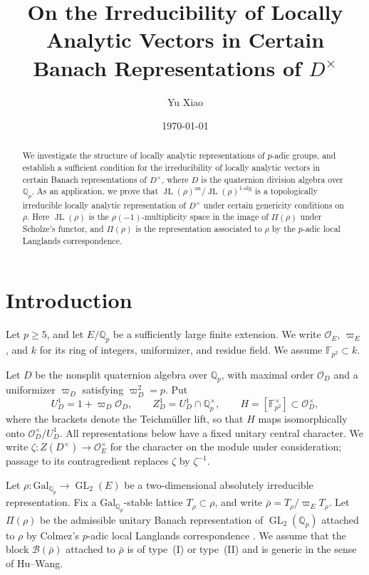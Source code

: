 \documentclass[11pt]{article}
\title{On the Irreducibility of Locally Analytic Vectors in Certain Banach Representations of \(D^\times\)}
\author{Yu Xiao}
\date{\today}
\theoremstyle{definition}
\newcommand{\cO}{\mathcal O}
\newcommand{\GL}{\operatorname{GL}}
\newcommand{\JL}{\operatorname{JL}}
\begin{document}
\maketitle

\begin{abstract}
      We investigate the structure of locally analytic representations of $p$-adic groups, 
      and establish a sufficient condition for the irreducibility of locally analytic vectors in certain Banach representations of \(D^\times\), where $D$ is the quaternion division algebra over $\mathbb{Q}_p$.
      As an application, we prove that \(\JL(\rho)^{\mathrm{an}}/\JL(\rho)^{1\text{-}\mathrm{alg}}\) is a topologically irreducible locally analytic representation of $D^\times$
      under certain genericity conditions on \(\rho\). Here \(\JL(\rho)\) is the \(\rho(-1)\)-multiplicity space in the image of \(\Pi(\rho)\) under Scholze's functor,
      and \(\Pi(\rho)\) is the representation associated to $\rho$ by the \(p\)-adic local Langlands correspondence.
\end{abstract}
\begingroup
\hypersetup{linkcolor=black}
\tableofcontents
\endgroup

\section*{Introduction}

Let $p\geq 5$, and let $E/\mathbb Q_p$ be a sufficiently large finite
extension. We write $\cO_E$, $\varpi_E$, and $k$ for its ring of integers,
uniformizer, and residue field.  We assume $\mathbb F_{p^2}\subset k$.

Let $D$ be the nonsplit quaternion algebra over $\mathbb Q_p$, with
maximal order $\cO_D$ and a uniformizer $\varpi_D$ satisfying
$\varpi_D^2=p$.  Put
\[
 U_D^1=1+\varpi_D\mathcal{O}_D,
 \qquad Z_D^1=U_D^1\cap \mathbb Q_p^\times,
 \qquad
 H=[\mathbb F_{p^2}^{\times}]\subset \cO_D^\times,
\]
where the brackets denote the Teichm\"uller lift, so that $H$ maps
isomorphically onto $\cO_D^\times/U_D^1$.
All representations below have a fixed unitary central character.
We write $\zeta:Z(D^\times)\to\cO_E^\times$ for the character on the
module under consideration; passage to its contragredient replaces
$\zeta$ by $\zeta^{-1}$.

Let
\(
 \rho:\mathrm{Gal}_{\mathbb Q_p}\longrightarrow\GL_2(E)
\)
be a two-dimensional absolutely irreducible representation.  Fix a
$\mathrm{Gal}_{\mathbb Q_p}$-stable lattice $T_\rho\subset\rho$, and write
$\bar\rho=T_\rho/\varpi_ET_\rho$.  Let $\Pi(\rho)$ be the admissible
unitary Banach representation of $\GL_2(\mathbb Q_p)$ attached to $\rho$
by Colmez's $p$-adic local Langlands correspondence \cite{Colmez2010}.
We assume that the block $\mathscr B(\bar\rho)$ attached to $\bar\rho$ is
of type~(I) or type~(II) and is generic in the sense of Hu--Wang.  
\end{document}
